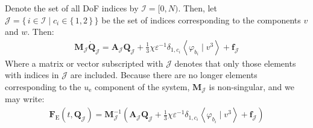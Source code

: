 \documentclass{article}
\newcommand{\bvec}[1]{\boldsymbol{#1}}
\newcommand{\bmat}[1]{\boldsymbol{#1}}
\begin{document}
Denote the set of all DoF indices by $\mathcal{I} = [0, N)$.
Then, let $\mathcal{J} = \{\, i \in \mathcal{I} \mid c_i \in \{\,1, 2\,\} \,\}$
be the set of indices corresponding to the components $v$ and $w$. Then:
\begin{align*}
    \bmat{M}_\mathcal{J} \dot{\bvec{Q}}_\mathcal{J}
        = \bmat{A}_\mathcal{J} \bvec{Q}_\mathcal{J}
            + \frac{1}{3} \chi \varepsilon^{-1} \delta_{1, c_i}
                \left< \varphi_{b_i} \mid v^3 \right>
            + \bvec{f}_\mathcal{J}
\end{align*}
\noindent Where a matrix or vector subscripted with $\mathcal{J}$
denotes that only those elements with indices in $\mathcal{J}$ are included.
Because there are no longer elements corresponding to the $u_\text{e}$ component
of the system, $\bmat{M}_\mathcal{J}$ is non-singular, and we may write:
\begin{align*}
    \bvec{F}_\text{E}(t, \bvec{Q}_\mathcal{J})
        = \bmat{M}_\mathcal{J}^{-1}
            (\bmat{A}_\mathcal{J} \bvec{Q}_\mathcal{J}
                + \frac{1}{3} \chi \varepsilon^{-1} \delta_{1, c_i}
                    \left< \varphi_{b_i} \mid v^3 \right>
                + \bvec{f}_\mathcal{J})
\end{align*}
\end{document}
